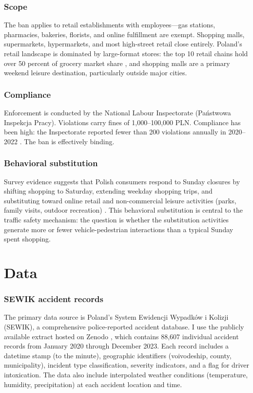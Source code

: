 \documentclass[12pt]{article}
\begin{document}
\subsubsection*{Scope} The ban applies to retail establishments with employees---gas stations, pharmacies, bakeries, florists, and online fulfillment are exempt. Shopping malls, supermarkets, hypermarkets, and most high-street retail close entirely. Poland's retail landscape is dominated by large-format stores: the top 10 retail chains hold over 50 percent of grocery market share \citep{pmr2022poland}, and shopping malls are a primary weekend leisure destination, particularly outside major cities.

\subsubsection*{Compliance} Enforcement is conducted by the National Labour Inspectorate (Pa\'{n}stwowa Inspekcja Pracy). Violations carry fines of 1,000--100,000 PLN. Compliance has been high: the Inspectorate reported fewer than 200 violations annually in 2020--2022 \citep{pip2022annual}. The ban is effectively binding.

\subsubsection*{Behavioral substitution} Survey evidence suggests that Polish consumers respond to Sunday closures by shifting shopping to Saturday, extending weekday shopping trips, and substituting toward online retail and non-commercial leisure activities (parks, family visits, outdoor recreation) \citep{ciura2019sunday}. This behavioral substitution is central to the traffic safety mechanism: the question is whether the substitution activities generate more or fewer vehicle-pedestrian interactions than a typical Sunday spent shopping.


\section{Data}
\label{sec:data}

\subsubsection*{SEWIK accident records} The primary data source is Poland's System Ewidencji Wypadk\'{o}w i Kolizji (SEWIK), a comprehensive police-reported accident database. I use the publicly available extract hosted on Zenodo \citep{faruga2025sewik}, which contains 88,607 individual accident records from January 2020 through December 2023. Each record includes a datetime stamp (to the minute), geographic identifiers (voivodeship, county, municipality), incident type classification, severity indicators, and a flag for driver intoxication. The data also include interpolated weather conditions (temperature, humidity, precipitation) at each accident location and time.
\end{document}
